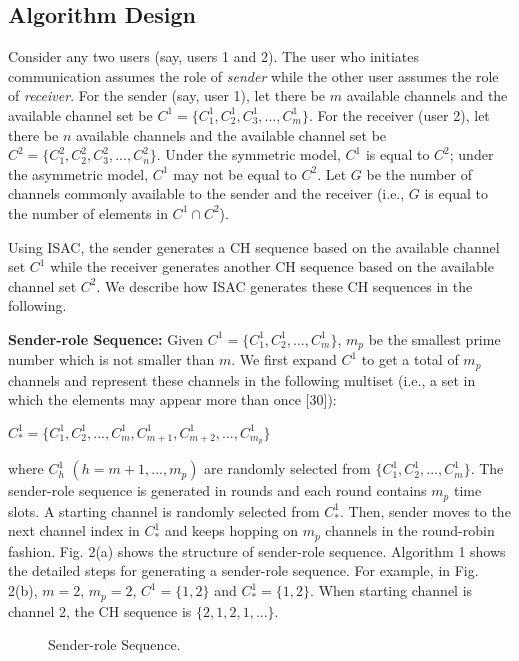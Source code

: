 \documentclass[journal]{IEEEtran}
\begin{document}
\subsection{Algorithm Design}
\par Consider any two users (say, users 1 and 2). The user who initiates communication assumes the role of \emph{sender} while the other user assumes the role of \emph{receiver}. For the sender (say, user 1), let there be $m$ available channels and the available channel set be $C^1=\{C^1_1, C^1_2, C^1_3,..., C^1_m\}$. For the receiver (user 2), let there be $n$ available channels and the available channel set be $C^2=\{C^2_1, C^2_2, C^2_3,..., C^2_n\}$. Under the symmetric model, $C^1$ is equal to $C^2$; under the asymmetric model, $C^1$ may not be equal to $C^2$. Let $G$ be the number of channels commonly available to the sender and the receiver (i.e., $G$ is equal to the number of elements in $C^1\cap C^2$).
\par Using ISAC, the sender generates a CH sequence based on the available channel set $C^1$ while the receiver generates another CH sequence based on the available channel set $C^2$. We describe how ISAC generates these CH sequences in the following.
\par \textbf{Sender-role Sequence: }Given $C^1=\{C_1^1, C_2^1, ..., C_m^1\}$, $m_p$ be the smallest prime number which is not smaller than $m$. We first expand $C^1$ to get a total of $m_p$ channels and represent these channels in the following multiset (i.e., a set in which the elements may appear more than once [30]):
\centerline{$C^1_*=\{C_1^1, C_2^1, ..., C_m^1, C_{m+1}^1, C_{m+2}^1, ..., C_{m_p}^1\}$}
where $C_h^1$ $(h=m+1, ...,m_p)$ are randomly selected from $\{C_1^1, C_2^1, ..., C_m^1\}$. The sender-role sequence is generated in rounds and each round contains $m_p$ time slots. A starting channel is randomly selected from $C^1_*$. Then, sender moves to the next channel index in $C^1_*$ and keeps hopping on $m_p$ channels in the round-robin fashion. Fig. 2(a) shows the structure of sender-role sequence. Algorithm 1 shows the detailed steps for generating a sender-role sequence. For example, in Fig. 2(b), $m=2$, $m_p=2$, $C^1=\{1, 2\}$ and $C^1_*=\{1, 2\}$. When starting channel is channel 2, the CH sequence is $\{2, 1, 2, 1, ...\}$.
\begin{figure}
\centering
{}
\hspace{1in}
\caption{Sender-role Sequence.}
\label{fig:subfig} \end{figure}
\end{document}
